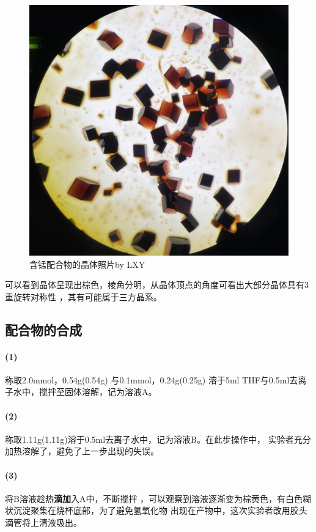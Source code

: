 \documentclass[a4paper,zihao=5,UTF8]{ctexart}
\begin{document}
	\begin{figure}[htbp]
		\centering
		\includegraphics[scale=0.30]{Mn_LXY.jpg}
		\caption{含锰配合物的晶体照片by LXY}
	\end{figure}
	可以看到晶体呈现出棕色，棱角分明，从晶体顶点的角度可看出大部分晶体具有3重旋转对称性
	，其有可能属于三方晶系。
	\subsection{配合物的合成}
	\paragraph{(1)}称取2.0mmol，0.54g(0.54g)
	与0.1mmol，0.24g(0.25g)
	溶于5ml THF与0.5ml去离子水中，搅拌至固体溶解，记为溶液A。
	\paragraph{(2)}
	称取1.11g(1.11g)溶于0.5ml去离子水中，记为溶液B。在此步操作中，
	实验者充分加热溶解了，避免了上一步出现的失误。
	\paragraph{(3)}
	将B溶液趁热\textbf{滴加}入A中，不断搅拌
	，可以观察到溶液逐渐变为棕黄色，有白色糊状沉淀聚集在烧杯底部，为了避免氢氧化物
	出现在产物中，这次实验者改用胶头滴管将上清液吸出。
\end{document}
